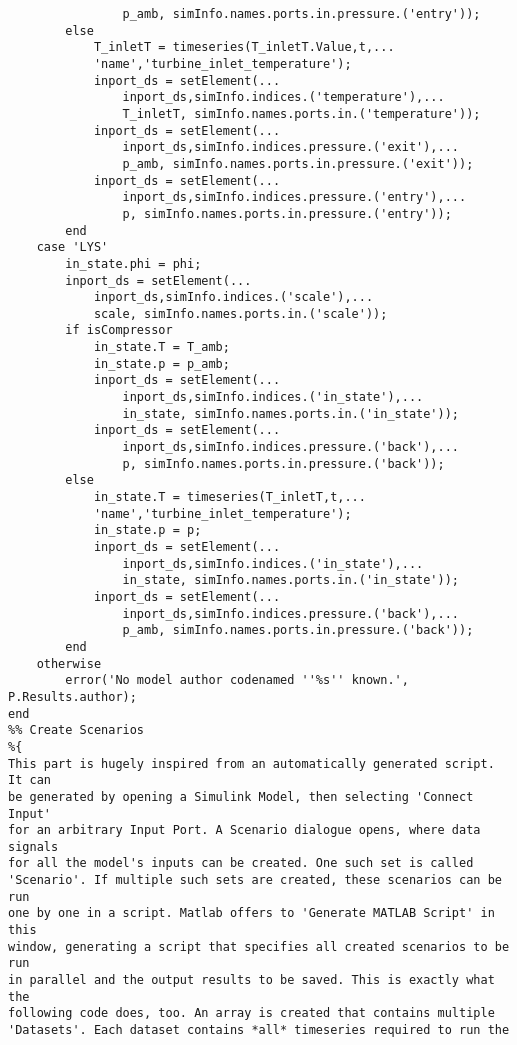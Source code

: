 \begin{lstlisting}
                p_amb, simInfo.names.ports.in.pressure.('entry'));
        else
            T_inletT = timeseries(T_inletT.Value,t,...
            'name','turbine_inlet_temperature');
            inport_ds = setElement(...
                inport_ds,simInfo.indices.('temperature'),...
                T_inletT, simInfo.names.ports.in.('temperature'));
            inport_ds = setElement(...
                inport_ds,simInfo.indices.pressure.('exit'),...
                p_amb, simInfo.names.ports.in.pressure.('exit'));
            inport_ds = setElement(...
                inport_ds,simInfo.indices.pressure.('entry'),...
                p, simInfo.names.ports.in.pressure.('entry'));   
        end
    case 'LYS'
        in_state.phi = phi;
        inport_ds = setElement(...
            inport_ds,simInfo.indices.('scale'),...
            scale, simInfo.names.ports.in.('scale'));
        if isCompressor
            in_state.T = T_amb;
            in_state.p = p_amb;
            inport_ds = setElement(...
                inport_ds,simInfo.indices.('in_state'),...
                in_state, simInfo.names.ports.in.('in_state'));
            inport_ds = setElement(...
                inport_ds,simInfo.indices.pressure.('back'),...
                p, simInfo.names.ports.in.pressure.('back'));
        else
            in_state.T = timeseries(T_inletT,t,...
            'name','turbine_inlet_temperature');
            in_state.p = p;
            inport_ds = setElement(...
                inport_ds,simInfo.indices.('in_state'),...
                in_state, simInfo.names.ports.in.('in_state'));
            inport_ds = setElement(...
                inport_ds,simInfo.indices.pressure.('back'),...
                p_amb, simInfo.names.ports.in.pressure.('back'));
        end
    otherwise
        error('No model author codenamed ''%s'' known.', P.Results.author);
end
%% Create Scenarios
%{
This part is hugely inspired from an automatically generated script. It can
be generated by opening a Simulink Model, then selecting 'Connect Input'
for an arbitrary Input Port. A Scenario dialogue opens, where data signals
for all the model's inputs can be created. One such set is called
'Scenario'. If multiple such sets are created, these scenarios can be run
one by one in a script. Matlab offers to 'Generate MATLAB Script' in this
window, generating a script that specifies all created scenarios to be run
in parallel and the output results to be saved. This is exactly what the
following code does, too. An array is created that contains multiple
'Datasets'. Each dataset contains *all* timeseries required to run the

\end{lstlisting}
